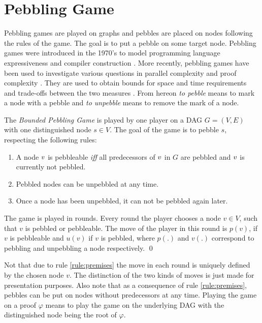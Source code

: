\section{Pebbling Game}
\label{sec:pebbling-game}

Pebbling games are played on graphs and pebbles are placed on nodes following the rules of the game.
The goal is to put a pebble on some target node.
Pebbling games were introduced in the 1970's to model programming language expressiveness \cite{Pippenger1980,Walker1973} and compiler construction \cite{Sethi1975}. 
More recently, pebbling games have been used to investigate various questions in parallel complexity \cite{Chan2013} and proof complexity \cite{Ben-Sasson2009,Esteban2001,Nordstroem2009}. 
They are used to obtain bounds for space and time requirements and trade-offs between the two measures \cite{EmdeBoas1979,Ben-Sasson2002}. 
From hereon \textit{to pebble} means to mark a node with a pebble and \textit{to unpebble} means to remove the mark of a node.

\begin{definition}
\label{def:pebbling-game}
The \emph{Bounded Pebbling Game} is played by one player on a DAG $G = (V,E)$ with one distinguished node $s \in V$.
The goal of the game is to pebble $s$, respecting the following rules:
\begin{enumerate}
	\item \label{rule:premises} A node $v$ is pebbleable \emph{iff} all predecessors of $v$ in $G$ are pebbled and $v$ is currently not pebbled.
	\item \label{rule:unpebbling} Pebbled nodes can be unpebbled at any time.
	\item \label{rule:onlyonce} Once a node has been unpebbled, it can not be pebbled again later.
\end{enumerate}
The game is played in rounds.
Every round the player chooses a node $v \in V$, such that $v$ is pebbled or pebbleable.
The move of the player in this round is $p(v)$, if $v$ is pebbleable and $u(v)$ if $v$ is pebbled, where $p(.)$ and $v(.)$ correspond to pebbling and unpebbling a node respectively.
\qed
\end{definition}

Not that due to rule \ref{rule:premises} the move in each round is uniquely defined by the chosen node $v$.
The distinction of the two kinds of moves is just made for presentation purposes.
Also note that as a consequence of rule \ref{rule:premises}, pebbles can be put on nodes without predecessors at any time.
Playing the game on a proof $\varphi$ means to play the game on the underlying DAG with the distinguished node being the root of $\varphi$.

